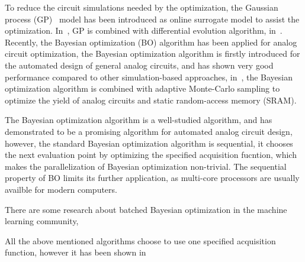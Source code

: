 %
To reduce the circuit simulations needed by the optimization, the Gaussian
process (GP)~\cite{GPML} model has been introduced as online surrogate model to
assist the optimization. In~\cite{liu2014gaspad}, GP is combined with
differential evolution algorithm, in~\cite{lyu2017efficient}. Recently, the
Bayesian optimization (BO) algorithm has been applied for analog circuit
optimization, the Bayesian optimization algorithm is firstly introduced for the
automated design of general analog circuits, and has shown very good
performance compared to other simulation-based approaches,
in~\cite{wang2017efficient}, the Bayesian optimization algorithm is combined
with adaptive Monte-Carlo sampling to optimize the yield of analog circuits and
static random-access memory (SRAM).

The Bayesian optimization algorithm is a well-studied algorithm, and has
demonstrated to be a promising algorithm for automated analog circuit design,
however, the standard Bayesian optimization algorithm is sequential, it chooses
the next evaluation point by optimizing the specified acquisition fucntion,
which makes the parallelization of Bayesian optimization non-trivial. The
sequential property of BO limits its further application, as multi-core
processors are usually availble for modern computers. 

There are some research about batched Bayesian optimization in the machine
learning community,


All the above mentioned algorithms choose to use one specified acquisition function, however it has been shown in \cite{}


